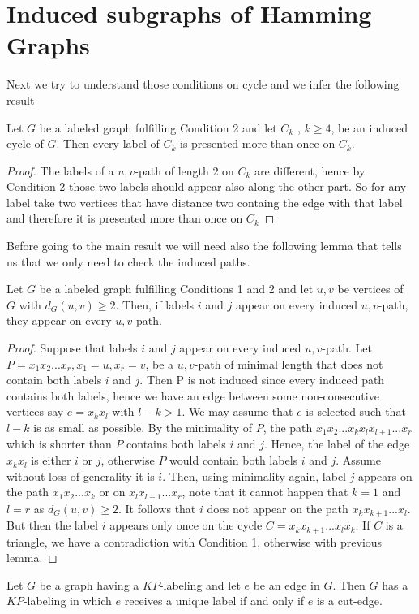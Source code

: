 \documentclass[12pt,a4paper,titlepage,openany]{report}
\begin{document}
\section{Induced subgraphs of Hamming Graphs}
Next we try to understand those conditions on cycle and we infer the following result
\begin{lemma}\label{lemma:cyclenotunique}Let $G$ be a labeled graph fulfilling Condition 2 and let $C_k$ , $k \geq 4$, be an induced cycle of $G$. Then every label of $C_k$ is presented more than once on $C_k$.
\end{lemma}
\begin{proof}
The labels of a $u, v$-path of length $2$ on $C_k$ are different, hence by Condition 2 those two labels should appear also along the other part. So for any label take two vertices that have distance two containg the edge with that label and therefore it is presented more than once on $C_k$ 
\end{proof}
Before going to the main result we will need also the following lemma that tells us that we only need to check the induced paths.
\begin{lemma}\label{lemma:inducedpaths}Let $G$ be a labeled graph fulfilling Conditions 1 and 2 and let $u, v$ be vertices of $G$ with $d_G(u,v)\geq 2$. Then, if labels $i$ and $j$ appear on every induced $u, v$-path, they appear on every $u, v$-path.
\end{lemma}
\begin{proof}
Suppose that labels $i$ and $j$ appear on every induced $u, v$-path. Let $P=x_1x_2...x_r, x_1=u,x_r=v$, be a $u, v$-path of minimal length that does not contain both labels $i$ and $j$. Then P is not induced since every induced path contains both labels, hence we have an edge between some non-consecutive vertices say $e=x_kx_l$ with $l-k>1$. We may assume that $e$ is selected such that $l-k$ is as small as possible. By the minimality of $P$, the path $x_1x_2...x_kx_lx_{l+1}...x_r$ which is shorter than $P$ contains both labels $i$ and $j$. Hence, the label of the edge $x_kx_l$ is either $i$ or $j$, otherwise $P$ would contain both labels $i$ and $j$. Assume without loss of generality it is $i$. Then, using minimality again, label $j$ appears on the path $x_1x_2...x_k$ or on $x_lx_{l+1}...x_r$, note that it cannot happen that $k=1$ and $l=r$ as $d_G(u,v)\geq 2$. It follows that $i$ does not appear on the path $x_kx_{k+1}...x_l$. But then the label $i$ appears only once on the cycle $C=x_kx_{k+1}...x_lx_k$. If $C$ is a triangle, we have a contradiction with Condition 1,
otherwise with previous lemma.
\end{proof}
\begin{proposition}
Let $G$ be a graph having a $KP$-labeling and let $e$ be an edge in $G$. Then $G$ has a $KP$-labeling in which $e$ receives a unique label if and only if $e$ is a cut-edge.
\end{proposition}
\end{document}
